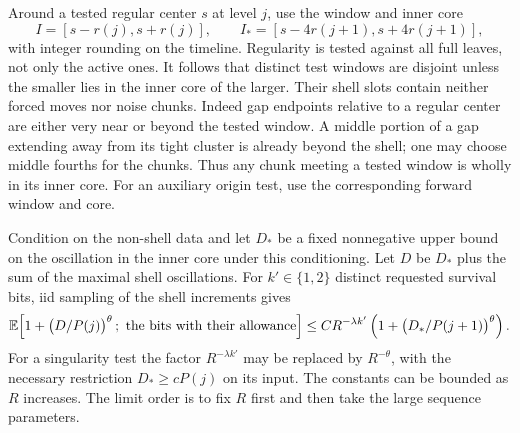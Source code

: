 Around a tested regular center $s$ at level $j$, use the window
and inner core
\begin{equation}\label{addr:windows}
 I=[s-r(j),s+r(j)],\qquad
 I_*=[s-4r(j+1),s+4r(j+1)],
\end{equation}
with integer rounding on the timeline.  Regularity is tested against
all full leaves, not only the active ones.  It follows that distinct
test windows are disjoint unless the smaller lies in the inner core
of the larger.  Their shell slots contain neither forced moves nor
noise chunks.  Indeed gap endpoints relative to a regular center are
either very near or beyond the tested window.  A middle portion of a
gap extending away from its tight cluster is already beyond the shell;
one may choose middle fourths for the chunks.  Thus any chunk meeting
a tested window is wholly in its inner core.  For an auxiliary
origin test, use the corresponding forward window and core.

\begin{lemma}\label{addr:shell-moment}
Condition on the non-shell data and let $D_*$ be a fixed nonnegative
upper bound on the oscillation in the inner core under this conditioning.
Let $D$ be $D_*$ plus the sum of the maximal shell oscillations.
For $k'\in\{1,2\}$ distinct requested survival bits, iid sampling
of the shell increments gives
\begin{equation}\label{eq:original-26}
 \E\!\left[
    1+\bigl(D/P(j)\bigr)^\theta\,;\ 
       \text{the bits with their allowance}
       \right]
 \le C R^{-\lambda k'}
       \left(1+\bigl(D_*/P(j+1)\bigr)^\theta\right).
\end{equation}
For a singularity test the factor $R^{-\lambda k'}$ may be
replaced by $R^{-\theta}$, with the necessary restriction
$D_*\ge cP(j)$ on its input.  The constants can be bounded as
$R$ increases.  The limit order is to fix $R$ first and then
take the large sequence parameters.
\end{lemma}


